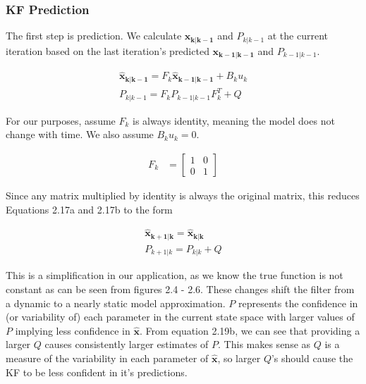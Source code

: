   \subsubsection{KF Prediction}
  
  The first step is prediction. We calculate $\bm{x_{k|k-1}}$ and $P_{k|k-1}$ at the current iteration based on the last iteration's predicted $\bm{x_{k-1|k-1}}$ and $P_{k-1|k-1}$.
  
  \begin{subequations}
  \begin{align}
  \bm{\hat{x}_{k|k-1}} = F_{k} \bm{\hat{x}_{k-1|k-1}}+B_{k}u_{k}   \\
  P_{k|k-1} = F_{k} P_{k-1|k-1}F_{k}^{T}+Q
  \end{align}
  \end{subequations}
  
  For our purposes, assume $F_{k}$ is always identity, meaning the model does not change with time. We also assume $B_{k}u_{k} = 0$.
  
  \begin{align}
    F_{k} &= \begin{bmatrix}
           1&0 \\
           0&1
         \end{bmatrix}
  \end{align}
  
  Since any matrix multiplied by identity is always the original matrix, this reduces Equations 2.17a and 2.17b to the form
  
  \begin{subequations}
  \begin{align}
  \bm{\hat{x}_{k+1|k}} = \bm{\hat{x}_{k|k}}  \\
  P_{k+1|k} = P_{k|k}+Q
  \end{align}
  \end{subequations}
  
  This is a simplification in our application, as we know the true function is not constant as can be seen from figures 2.4 - 2.6. These changes shift the filter from a dynamic to a nearly static model approximation. $P$ represents the confidence in (or variability of) each parameter in the current state space with larger values of $P$ implying less confidence in $\bm{\hat{x}}$. From equation 2.19b, we can see that providing a larger $Q$ causes consistently larger estimates of $P$. This makes sense as $Q$ is a measure of the variability in each parameter of $\bm{\hat{x}}$, so larger $Q$'s should cause the KF to be less confident in it's predictions.
  
